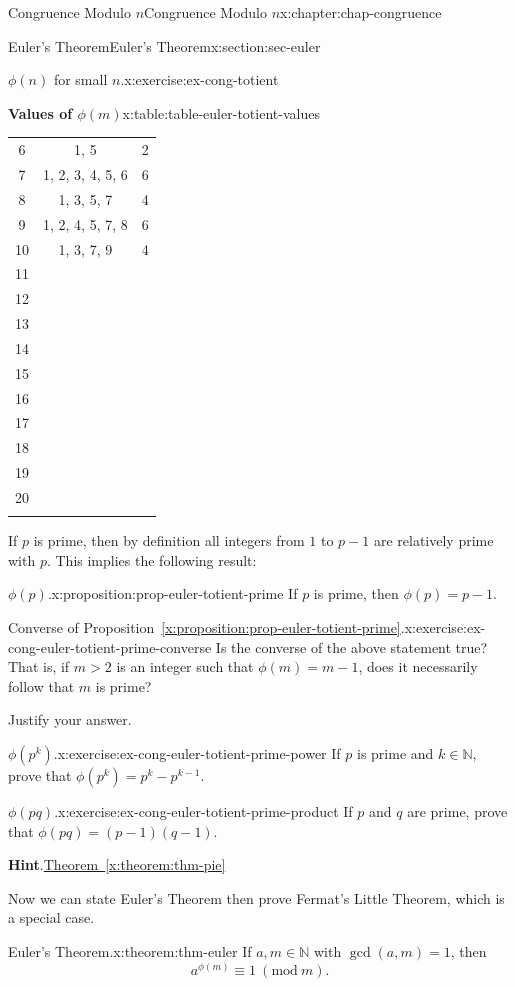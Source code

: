 \documentclass[oneside,10pt,]{book}
\newcommand{\blocktitlefont}{\relax}
\newcommand{\xreffont}{\relax}
\numberwithin{equation}{section}
\newcommand{\hrulemedium}{\noalign{\hrule height 0.07em}}
\newcommand{\Mod}[1]{\ \left(\mathrm{mod}\ #1\right)}
\newcommand{\gt}{>}
\begin{document}
\begin{chapterptx}{Congruence Modulo \(n\)}{}{Congruence Modulo \(n\)}{}{}{x:chapter:chap-congruence}
\begin{sectionptx}{Euler's Theorem}{}{Euler's Theorem}{}{}{x:section:sec-euler}
\begin{inlineexercise}{\(\phi(n)\) for small \(n\).}{x:exercise:ex-cong-totient}
\begin{tableptx}{\textbf{Values of \(\phi(m)\)}}{x:table:table-euler-totient-values}{}
{\begin{tabular}{ccc}
6&1, 5&2\tabularnewline[0pt]
7&1, 2, 3, 4, 5, 6&6\tabularnewline[0pt]
8&1, 3, 5, 7&4\tabularnewline[0pt]
9&1, 2, 4, 5, 7, 8&6\tabularnewline[0pt]
10&1, 3, 7, 9&4\tabularnewline\hrulemedium
11&&\tabularnewline[0pt]
12&&\tabularnewline[0pt]
13&&\tabularnewline[0pt]
14&&\tabularnewline[0pt]
15&&\tabularnewline\hrulemedium
16&&\tabularnewline[0pt]
17&&\tabularnewline[0pt]
18&&\tabularnewline[0pt]
19&&\tabularnewline[0pt]
20&&\tabularnewline\hrulemedium
\end{tabular}
}%
\end{tableptx}%
\end{inlineexercise}
If \(p\) is prime, then by definition all integers from \(1\) to \(p-1\) are relatively prime with \(p\). This implies the following result:%
\begin{proposition}{\(\phi(p)\).}{}{x:proposition:prop-euler-totient-prime}%
If \(p\) is prime, then \(\phi(p) = p-1\).%
\end{proposition}
\begin{inlineexercise}{Converse of Proposition~{\xreffont\ref*{x:proposition:prop-euler-totient-prime}}.}{x:exercise:ex-cong-euler-totient-prime-converse}%
Is the converse of the above statement true? That is, if \(m \gt 2\) is an integer such that \(\phi(m) = m-1\), does it necessarily follow that \(m\) is prime?%
\par
Justify your answer.%
\end{inlineexercise}
\begin{inlineexercise}{\(\phi(p^k)\).}{x:exercise:ex-cong-euler-totient-prime-power}%
If \(p\) is prime and \(k \in \mathbb{N}\), prove that \(\phi(p^k) = p^k - p^{k-1}\).%
\end{inlineexercise}
\begin{inlineexercise}{\(\phi(pq)\).}{x:exercise:ex-cong-euler-totient-prime-product}%
If \(p\) and \(q\) are prime, prove that \(\phi(pq) = (p-1)(q-1)\).%
\par\smallskip%
\noindent\textbf{\blocktitlefont Hint}.\hypertarget{g:hint:id457043}{}\quad{}\hyperref[x:theorem:thm-pie]{Theorem~{\xreffont\ref{x:theorem:thm-pie}}}%
\end{inlineexercise}
Now we can state Euler's Theorem then prove Fermat's Little Theorem, which is a special case.%
\begin{theorem}{Euler's Theorem.}{}{x:theorem:thm-euler}%
If \(a, m \in \mathbb{N}\) with \(\gcd(a,m) = 1\), then%
\begin{equation*}
a^{\phi(m)} \equiv 1 \Mod{m}\text{.}
\end{equation*}

\end{theorem}
\end{sectionptx}
\end{chapterptx}
\end{document}

